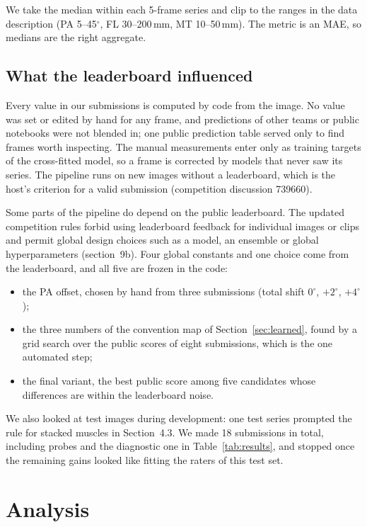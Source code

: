 \documentclass[11pt,a4paper]{article}
\begin{document}
We take the median within each 5-frame series and clip to the ranges in the data description (PA 5--45$^\circ$, FL 30--200\,mm, MT 10--50\,mm). The metric is an MAE, so medians are the right aggregate.

\subsection{What the leaderboard influenced}
\label{sec:lb-use}

Every value in our submissions is computed by code from the image. No value was set or edited by hand for any frame, and predictions of other teams or public notebooks were not blended in; one public prediction table served only to find frames worth inspecting. The manual measurements enter only as training targets of the cross-fitted model, so a frame is corrected by models that never saw its series. The pipeline runs on new images without a leaderboard, which is the host's criterion for a valid submission (competition discussion 739660).

Some parts of the pipeline do depend on the public leaderboard. The updated competition rules forbid using leaderboard feedback for individual images or clips and permit global design choices such as a model, an ensemble or global hyperparameters (section~9b). Four global constants and one choice come from the leaderboard, and all five are frozen in the code:
\begin{itemize}
\item the PA offset, chosen by hand from three submissions (total shift $0^\circ$, $+2^\circ$, $+4^\circ$);
\item the three numbers of the convention map of Section~\ref{sec:learned}, found by a grid search over the public scores of eight submissions, which is the one automated step;
\item the final variant, the best public score among five candidates whose differences are within the leaderboard noise.
\end{itemize}
We also looked at test images during development: one test series prompted the rule for stacked muscles in Section~4.3. We made 18 submissions in total, including probes and the diagnostic one in Table~\ref{tab:results}, and stopped once the remaining gains looked like fitting the raters of this test set.

\section{Analysis}
\end{document}
